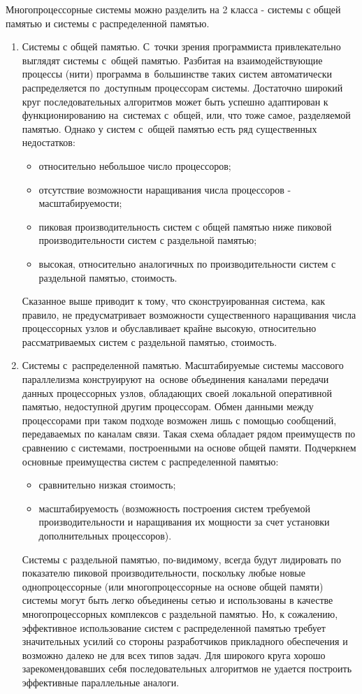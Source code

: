 Многопроцессорные системы можно разделить на 2 класса - системы с общей памятью
и системы с распределенной памятью.
\begin{enumerate}
\item  Системы с общей памятью. С~точки зрения программиста привлекательно
выглядят системы с~общей памятью.
Разбитая на взаимодействующие процессы (нити) программа в~большинстве таких
систем автоматически распределяется по~доступным процессорам системы. Достаточно
широкий круг последовательных алгоритмов может быть успешно адаптирован к~
функционированию на~системах с~общей, или, что тоже самое, разделяемой памятью.
Однако у систем с~общей памятью есть ряд существенных недостатков:
\begin{itemize}
\item относительно небольшое число процессоров;
\item отсутствие возможности наращивания числа процессоров - масштабируемости;
\item пиковая производительность систем с общей памятью ниже пиковой
производительности систем с раздельной памятью;
\item высокая, относительно аналогичных по производительности систем с
раздельной памятью, стоимость.
\end{itemize}
Сказанное выше приводит к тому, что сконструированная система, как правило, не
предусматривает возможности существенного наращивания числа процессорных узлов и
обуславливает крайне высокую, относительно рассматриваемых систем с раздельной
памятью, стоимость.
 
\item Системы с~распределенной памятью. Масштабируемые системы массового параллелизма
конструируют на~основе объединения каналами передачи данных процессорных узлов,
обладающих своей локальной оперативной памятью, недоступной другим процессорам. Обмен данными
между процессорами при таком подходе возможен лишь с помощью сообщений,
передаваемых по каналам связи. Такая схема обладает рядом преимуществ по
сравнению с системами, построенными на основе общей памяти. Подчеркнем основные
преимущества систем с распределенной памятью:
\begin{itemize}
\item сравнительно низкая стоимость;
\item масштабируемость (возможность построения систем требуемой
производительности и наращивания их мощности за счет установки дополнительных
процессоров).
\end{itemize}
Системы с раздельной памятью, по-видимому, всегда будут лидировать по показателю
пиковой производительности, поскольку любые новые однопроцессорные (или
многопроцессорные на основе общей памяти) системы могут быть легко объединены
сетью и использованы в качестве многопроцессорных комплексов с раздельной
памятью.
Но, к сожалению, эффективное использование систем с распределенной памятью
требует значительных усилий со стороны разработчиков прикладного обеспечения и
возможно далеко не для всех типов задач. Для широкого круга хорошо
зарекомендовавших себя последовательных алгоритмов не удается построить
эффективные параллельные аналоги.
\end{enumerate}

